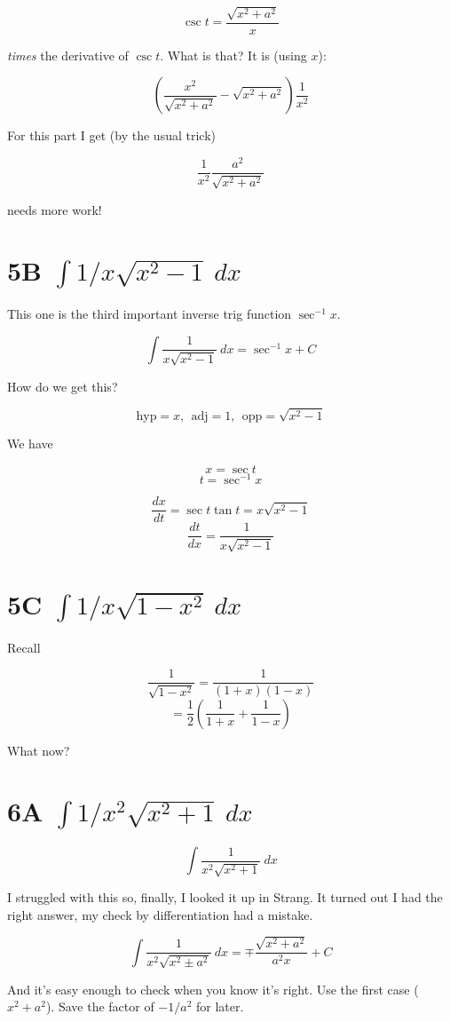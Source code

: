 \documentclass[11pt, oneside]{article}
\begin{document}
\[ \csc t = \frac{\sqrt{x^2 + a^2}}{x} \] 

\emph{times} the derivative of $\csc t$.  What is that?  It is (using $x$):

\[ (\frac{x^2}{\sqrt{x^2 + a^2}} - \sqrt{x^2 + a^2}) \frac{1}{x^2} \]

For this part I get (by the usual trick)

\[ \frac{1}{x^2} \frac{a^2}{\sqrt{x^2+a^2}} \]

needs more work!

\section*{5B $\int 1/x \sqrt{x^2 - 1} \ dx$}

This one is the third important inverse trig function $\sec^{-1} x$.

\[ \int \frac{1}{x \sqrt{x^2 - 1} } \ dx = \sec^{-1} x + C \]

How do we get this?

\[ \text{hyp} = x, \ \ \text{adj} = 1, \ \ \text{opp} = \sqrt{x^2-1}  \]

We have 

\[ x = \sec t \]
\[ t = \sec^{-1} x \]

\[ \frac{dx}{dt} = \sec t \tan t = x  \sqrt{x^2-1} \]
\[ \frac{dt}{dx} = \frac{1}{x  \sqrt{x^2-1}}  \]

\section*{5C $\int 1/x \sqrt{1 - x^2} \ dx$}

Recall 

\[ \frac{1}{\sqrt{1 - x^2}} = \frac{1}{(1+x)(1-x)} \]
\[ = \frac{1}{2} ( \frac{1}{1+x} + \frac{1}{1-x}) \]

What now?

\section*{6A $\int 1/x^2 \sqrt{x^2 + 1} \ dx$ }

\[ \int \frac{1}{x^2 \sqrt{x^2 + 1}} \ dx \]

I struggled with this so, finally, I looked it up in Strang.  It turned out I had the right answer, my check by differentiation had a mistake.

\[ \int \frac{1}{x^2 \sqrt{x^2 \pm a^2}} \ dx = \mp \frac{\sqrt{x^2 + a^2}}{a^2 x} + C \]

And it's easy enough to check when you know it's right.  Use the first case ($x^2 + a^2$). Save the factor of $-1/a^2$ for later.
\end{document}
